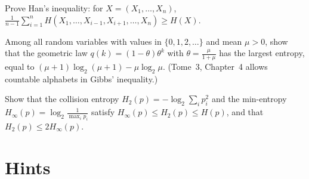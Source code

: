\begin{exercise}[$\star\star$]\label{ex:han}
Prove Han's inequality: for $X=(X_1,\dots,X_n)$, $\frac1{n-1}\sum_{i=1}^nH(X_1,\dots,X_{i-1},X_{i+1},\dots,X_n)\ge H(X)$.
\end{exercise}

\begin{exercise}[$\star\star$]\label{ex:geometric}
Among all random variables with values in $\{0,1,2,\dots\}$ and mean $\mu>0$, show that the geometric law $q(k)=(1-\theta)\theta^k$ with $\theta=\frac\mu{1+\mu}$ has the largest entropy, equal to $(\mu+1)\log_2(\mu+1)-\mu\log_2\mu$. (Tome~3, Chapter~4 allows countable alphabets in Gibbs' inequality.)
\end{exercise}

\begin{exercise}[$\star\star\star$]\label{ex:collision}
Show that the collision entropy $H_2(p)=-\log_2\sum_ip_i^2$ and the min-entropy $H_\infty(p)=\log_2\frac1{\max_ip_i}$ satisfy $H_\infty(p)\le H_2(p)\le H(p)$, and that $H_2(p)\le2H_\infty(p)$.
\end{exercise}

\section{Hints}

